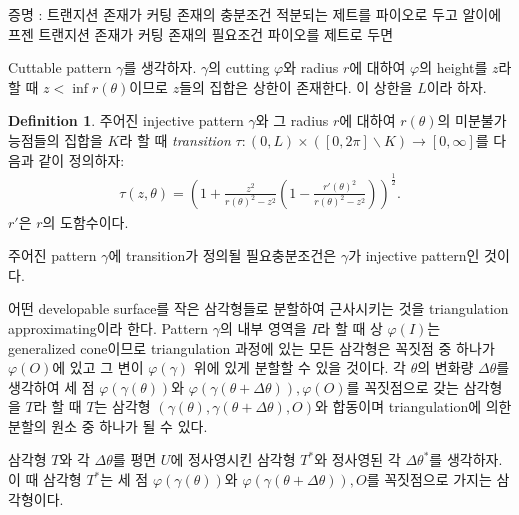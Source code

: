 \documentclass{amsart}
\theoremstyle{plain}
\theoremstyle{definition}
\newtheorem*{definition}{Definition}
\theoremstyle{remark}
\begin{document}
증명 : 트랜지션 존재가 커팅 존재의 충분조건
        적분되는 제트를 파이오로 두고 알이에프젠
       트랜지션 존재가 커팅 존재의 필요조건
        파이오를 제트로 두면
      
\fi










Cuttable pattern $\gamma$를 생각하자.
$\gamma$의 cutting $\varphi$와 radius $r$에 대하여 $\varphi$의 height를 $z$라 할 때 $z<\inf r(\theta)$이므로 $z$들의 집합은 상한이 존재한다.
이 상한을 $L$이라 하자.

\begin{definition}
주어진 injective pattern $\gamma$와 그 radius $r$에 대하여 $r(\theta)$의 미분불가능점들의 집합을 $K$라 할 때 {\it transition} $\tau : (0,L)\times\left([0,2\pi]\backslash K\right)\to[0,\infty]$를 다음과 같이 정의하자:
\begin{align}\label{tr1}
\tau(z,\theta)=\left(1+\frac{z^2}{r(\theta)^2 -z^2}\left(1-\frac{r'(\theta)^2}{r(\theta)^2 -z^2}\right)\right)^{\frac12}.
\end{align}
$r'$은 $r$의 도함수이다.
\end{definition}

주어진 pattern $\gamma$에 transition가 정의될 필요충분조건은 $\gamma$가 injective pattern인 것이다.

어떤 developable surface를 작은 삼각형들로 분할하여 근사시키는 것을 triangulation approximating이라 한다.
Pattern $\gamma$의 내부 영역을 $I$라 할 때 상 $\varphi(I)$는 generalized cone이므로 triangulation 과정에 있는 모든 삼각형은 꼭짓점 중 하나가 $\varphi(O)$에 있고 그 변이 $\varphi(\gamma)$ 위에 있게 분할할 수 있을 것이다.
각 $\theta$의 변화량 $\Delta\theta$를 생각하여 세 점 $\varphi(\gamma(\theta))$와 $\varphi(\gamma(\theta+\Delta\theta)), \varphi(O)$를 꼭짓점으로 갖는 삼각형을 $T$라 할 때 $T$는 삼각형 $(\gamma(\theta), \gamma(\theta+\Delta\theta), O)$와 합동이며 triangulation에 의한 분할의 원소 중 하나가 될 수 있다.

삼각형 $T$와 각 $\Delta\theta$를 평면 $U$에 정사영시킨 삼각형 $T^*$와 정사영된 각 $\Delta\theta^*$를 생각하자.
이 때 삼각형 $T^*$는 세 점 $\varphi(\gamma(\theta))$와 $\varphi(\gamma(\theta+\Delta\theta)), O$를 꼭짓점으로 가지는 삼각형이다.
\end{document}
